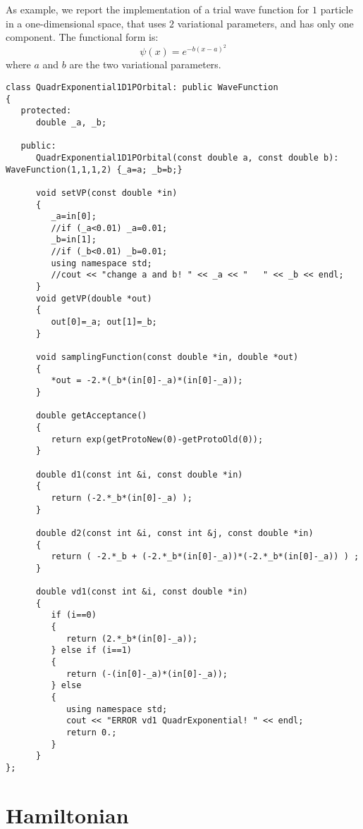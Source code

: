 \documentclass[11pt,a4paper,twoside]{article}
\begin{document}
As example, we report the implementation of a trial wave function for $1$ particle in a one-dimensional space, that uses $2$ variational parameters, and has only one component.
The functional form is:
\begin{equation}
   \psi(x) = e^{- b(x-a)^2}
\end{equation}
where $a$ and $b$ are the two variational parameters.

\begin{lstlisting}
class QuadrExponential1D1POrbital: public WaveFunction
{
   protected:
      double _a, _b;

   public:
      QuadrExponential1D1POrbital(const double a, const double b): WaveFunction(1,1,1,2) {_a=a; _b=b;}

      void setVP(const double *in)
      {
         _a=in[0];
         //if (_a<0.01) _a=0.01;
         _b=in[1];
         //if (_b<0.01) _b=0.01;
         using namespace std;
         //cout << "change a and b! " << _a << "   " << _b << endl;
      }
      void getVP(double *out)
      {
         out[0]=_a; out[1]=_b;
      }

      void samplingFunction(const double *in, double *out)
      {
         *out = -2.*(_b*(in[0]-_a)*(in[0]-_a));
      }

      double getAcceptance()
      {
         return exp(getProtoNew(0)-getProtoOld(0));
      }

      double d1(const int &i, const double *in)
      {
         return (-2.*_b*(in[0]-_a) );
      }

      double d2(const int &i, const int &j, const double *in)
      {
         return ( -2.*_b + (-2.*_b*(in[0]-_a))*(-2.*_b*(in[0]-_a)) ) ;
      }

      double vd1(const int &i, const double *in)
      {
         if (i==0)
         {
            return (2.*_b*(in[0]-_a));
         } else if (i==1)
         {
            return (-(in[0]-_a)*(in[0]-_a));
         } else
         {
            using namespace std;
            cout << "ERROR vd1 QuadrExponential! " << endl;
            return 0.;
         }
      }
};   
\end{lstlisting}




\section{Hamiltonian} %
\label{sec:hamiltonian}
\end{document}
